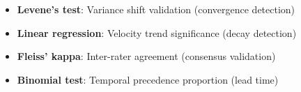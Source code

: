 
\begin{itemize}
\item \textbf{Levene's test}: Variance shift validation (convergence detection)
\item \textbf{Linear regression}: Velocity trend significance (decay detection)
\item \textbf{Fleiss' kappa}: Inter-rater agreement (consensus validation)
\item \textbf{Binomial test}: Temporal precedence proportion (lead time)
\end{itemize}
